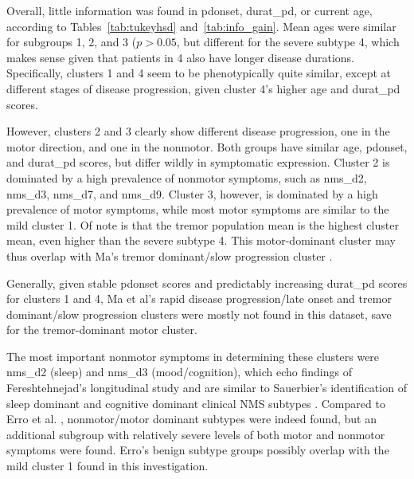 \documentclass[10pt]{article}
\begin{document}
\begin{multicols}{2}
Overall, little information was found in pdonset,
durat\_pd, or current age, according to Tables~\ref{tab:tukeyhsd}
and~\ref{tab:info_gain}.  Mean ages were similar for subgroups 1, 2, and 3 ($p >
0.05$, but different for the severe subtype 4, which makes sense given that
patients in 4 also have longer disease durations. Specifically, clusters 1 and
4 seem to be phenotypically quite similar, except at different stages of
disease progression, given cluster 4's higher age and durat\_pd scores.

However, clusters 2 and 3 clearly show different disease progression, one in
the motor direction, and one in the nonmotor. Both groups have similar age,
pdonset, and durat\_pd scores, but differ wildly in symptomatic expression.
Cluster 2 is dominated by a high prevalence of nonmotor symptoms, such as
nms\_d2, nms\_d3, nms\_d7, and nms\_d9. Cluster 3, however, is dominated by a
high prevalence of motor symptoms, while most motor symptoms are similar to the
mild cluster 1. Of note is that the tremor population mean
is the highest cluster mean, even higher than the severe subtype 4. This
motor-dominant cluster may thus overlap with Ma's tremor dominant/slow
progression cluster \cite{ma15}.

Generally, given stable pdonset scores and predictably increasing durat\_pd
scores for clusters 1 and 4, Ma et al's rapid disease
progression/late onset and tremor dominant/slow progression clusters
\cite{ma15} were mostly not found in this dataset, save for the tremor-dominant
motor cluster.

The most important nonmotor symptoms in determining these clusters were nms\_d2
(sleep) and nms\_d3 (mood/cognition), which echo findings of Fereshtehnejad's
longitudinal study \cite{fereshtehnejad15} and are similar to Sauerbier's
identification of sleep dominant and cognitive dominant clinical NMS subtypes
\cite{sauerbier15}. Compared to Erro et al. \cite{erro13}, nonmotor/motor
dominant subtypes were indeed found, but an additional subgroup with relatively
severe levels of both motor and nonmotor symptoms were found. Erro's benign
subtype groups possibly overlap with the mild cluster 1 found in this
investigation.


\end{multicols}
\end{document}
